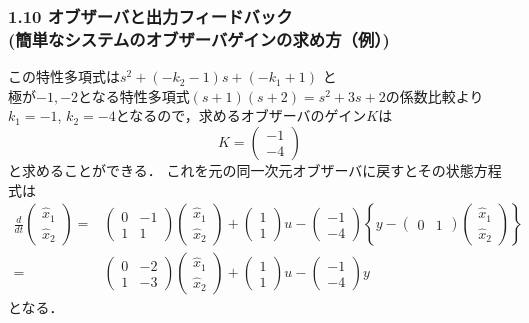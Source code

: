 \documentclass[10pt]{beamer}
\begin{document}
\begin{frame}[t]
\frametitle{1.10 オブザーバと出力フィードバック \\
(簡単なシステムのオブザーバゲインの求め方（例）)}
この特性多項式は$s^2 + (-k_2 - 1)s + (-k_1 + 1)$ と\\
極が$-1, -2$となる特性多項式$(s+1)(s+2) = s^2 + 3s + 2$の係数比較より\\
$k_1 = -1$, $k_2 = -4$となるので，求めるオブザーバのゲイン$K$は
\[
 K =
 \left(
 \begin{array}{c}
  -1 \\
  -4
 \end{array}
 \right)
\]
と求めることができる．
これを元の同一次元オブザーバに戻すとその状態方程式は
{\small
\begin{align}
 \frac{d}{dt}
 \left(
 \begin{array}{c}
  \hat{x}_1 \\
  \hat{x}_2
 \end{array}
 \right)
 =&
 \left(
 \begin{array}{cc}
  0 & -1 \\
  1 & 1
 \end{array}
 \right)
 \left(
 \begin{array}{c}
  \hat{x}_1 \\
  \hat{x}_2
 \end{array}
 \right) +
 \left(
 \begin{array}{c}
  1 \\
  1
 \end{array}
 \right) u -
  \left(
 \begin{array}{c}
  -1 \\
  -4
 \end{array}
 \right)
\left\{y -
 \left(
 \begin{array}{cc}
  0 & 1
 \end{array}
 \right)
 \left(
 \begin{array}{c}
  \hat{x}_1 \\
  \hat{x}_2
 \end{array}
 \right)\right\} \nonumber \\
=&
 \left(
 \begin{array}{cc}
  0 & -2 \\
  1 & -3
 \end{array}
 \right)
 \left(
 \begin{array}{c}
  \hat{x}_1 \\
  \hat{x}_2
 \end{array}
 \right) +
 \left(
 \begin{array}{c}
  1 \\
  1
 \end{array}
 \right) u -
  \left(
 \begin{array}{c}
  -1 \\
  -4
 \end{array}
 \right)
y
\end{align}
}
となる．

\end{frame}
\end{document}
